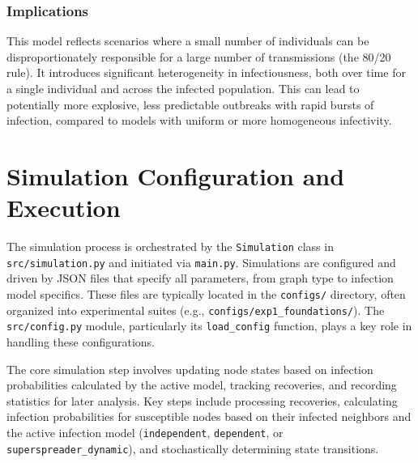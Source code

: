 \documentclass[12pt]{article}
\begin{document}
\subsubsection{Implications}
This model reflects scenarios where a small number of individuals can be disproportionately responsible for a large number of transmissions (the 80/20 rule). It introduces significant heterogeneity in infectiousness, both over time for a single individual and across the infected population. This can lead to potentially more explosive, less predictable outbreaks with rapid bursts of infection, compared to models with uniform or more homogeneous infectivity.

\section{Simulation Configuration and Execution}
The simulation process is orchestrated by the \texttt{Simulation} class in \texttt{src/simulation.py} and initiated via \texttt{main.py}. Simulations are configured and driven by JSON files that specify all parameters, from graph type to infection model specifics. These files are typically located in the \texttt{configs/} directory, often organized into experimental suites (e.g., \texttt{configs/exp1\_{}foun\-da\-tions/}). The \texttt{src/config.py} module, particularly its \texttt{load\_config} function, plays a key role in handling these configurations.

The core simulation step involves updating node states based on infection probabilities calculated by the active model, tracking recoveries, and recording statistics for later analysis. Key steps include processing recoveries, calculating infection probabilities for susceptible nodes based on their infected neighbors and the active infection model (\texttt{independent}, \texttt{dependent}, or \texttt{super\-spreader\_dynamic}), and stochastically determining state transitions.
\end{document}

